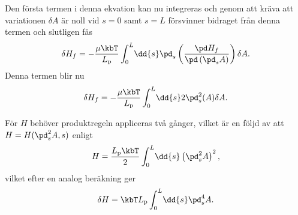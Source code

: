 Den första termen i denna ekvation kan nu integreras och genom att kräva att variationen $\delta A$ är noll vid $s=0$ samt $s=L$ försvinner bidraget från denna termen och slutligen fås 
\begin{equation}
    \delta H_f = -\frac{\mu\kbT}{L_\text{p}}\int_0^L\!\dd{s} \pd_s\left(\frac{\pd H_f}{\pd \left(\pd_sA\right)}\right)\delta A.
\end{equation}
Denna termen blir nu 
\begin{equation}
     \delta H_f = -\frac{\mu\kbT}{L_\text{p}}\int_0^L\!\dd{s} 2\pd_s^2(A)\delta A.
\end{equation}

För $H$ behöver produktregeln appliceras två gånger, vilket är en följd av att $H = H(\pd_s^2A,s)$ enligt 
\begin{equation}
     H = \frac{ L_\text{p}\kbT}{2}\int_0^L\!\dd{s}\left(\pd_s^2A\right)^2,
\end{equation}
vilket efter en analog beräkning ger 
\begin{equation}
     \delta H = \kbT L_\text{p}\int_0^L\!\dd{s} \pd_s^4A.
\end{equation}

